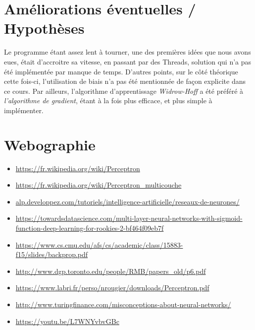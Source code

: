 \documentclass[11pt]{article}
\begin{document}
\section{Améliorations éventuelles / Hypothèses }

Le programme étant assez lent à tourner, une des premières idées que nous avons eues, était d'accroitre sa vitesse, en passant par des Threads, solution qui n'a pas été implémentée par manque de temps. \newline 
D'autres points, sur le côté théorique cette fois-ci, l'utilisation de biais n'a pas été mentionnée de façon explicite dans ce cours.  \newline
Par ailleurs, l'algorithme d'apprentissage \textit {Widrow-Hoff} a été préféré à \textit {l'algorithme de gradient}, étant à la fois plus efficace, et plus simple à implémenter. 

\clearpage

\section{Webographie} 
\begin{itemize}
\item \url{https://fr.wikipedia.org/wiki/Perceptron} \newline
\item \url{https://fr.wikipedia.org/wiki/Perceptron_multicouche} \newline
\item \url{alp.developpez.com/tutoriels/intelligence-artificielle/reseaux-de-neurones/} \newline
\item \url{https://towardsdatascience.com/multi-layer-neural-networks-with-sigmoid-function-deep-learning-for-rookies-2-bf464f09eb7f} \newline
\item \url{https://www.cs.cmu.edu/afs/cs/academic/class/15883-f15/slides/backprop.pdf} \newline
\item \url{http://www.dgp.toronto.edu/people/RMB/papers_old/p6.pdf} \newline
\item \url{https://www.labri.fr/perso/nrougier/downloads/Perceptron.pdf} \newline
\item \url{ http://www.turingfinance.com/misconceptions-about-neural-networks/} \newline
\item \url{https://youtu.be/L7WNYvbvGBc} \newline
\end{itemize}
\end{document}
